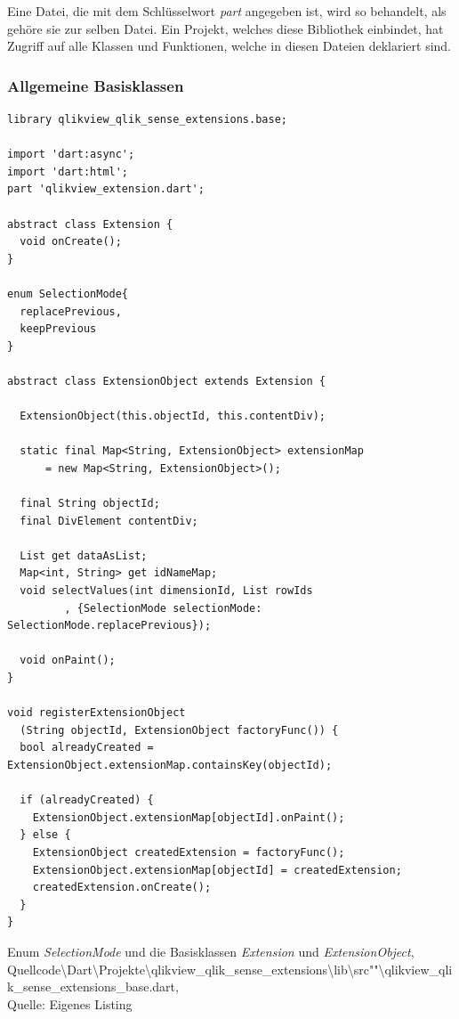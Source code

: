 Eine Datei, die mit dem Schlüssel\-wort \textit{part} angegeben ist, wird so behandelt, als gehöre sie zur selben Datei. Ein Projekt, welches diese Bibliothek einbindet, hat Zugriff auf alle Klassen und Funktionen, welche in diesen Dateien deklariert sind.

\subsubsection{Allgemeine Basisklassen}


\ifIncludeFigures\begin{listing}[htbp]
\begin{verbatim}
library qlikview_qlik_sense_extensions.base;

import 'dart:async';
import 'dart:html';
part 'qlikview_extension.dart'; 

abstract class Extension {
  void onCreate();
}

enum SelectionMode{
  replacePrevious,
  keepPrevious
}

abstract class ExtensionObject extends Extension {

  ExtensionObject(this.objectId, this.contentDiv);

  static final Map<String, ExtensionObject> extensionMap 
	  = new Map<String, ExtensionObject>();

  final String objectId;
  final DivElement contentDiv;

  List get dataAsList;
  Map<int, String> get idNameMap;
  void selectValues(int dimensionId, List rowIds
         , {SelectionMode selectionMode: SelectionMode.replacePrevious});
  
  void onPaint();
}

void registerExtensionObject
  (String objectId, ExtensionObject factoryFunc()) {
  bool alreadyCreated = ExtensionObject.extensionMap.containsKey(objectId);

  if (alreadyCreated) {
    ExtensionObject.extensionMap[objectId].onPaint();
  } else {
    ExtensionObject createdExtension = factoryFunc();
    ExtensionObject.extensionMap[objectId] = createdExtension;
    createdExtension.onCreate();
  }
}
\end{verbatim}
\caption[Enum \textit{SelectionMode} und die Basisklassen \textit{Extension} und \textit{ExtensionObject}]{Enum \textit{SelectionMode} und die Basisklassen \textit{Extension} und \textit{ExtensionObject}, \\Quellcode\textbackslash{}Dart\textbackslash{}Projekte\textbackslash{}qlikview\_qlik\_sense\_extensions\textbackslash{}lib\textbackslash{}src""\textbackslash{}qlikview\_qlik\_sense\_extensions\_base.dart, \\Quelle: Eigenes Listing}
\label{lst:QlikViewQlikSenseExtensionsBaseDart}
\end{listing}\fi


